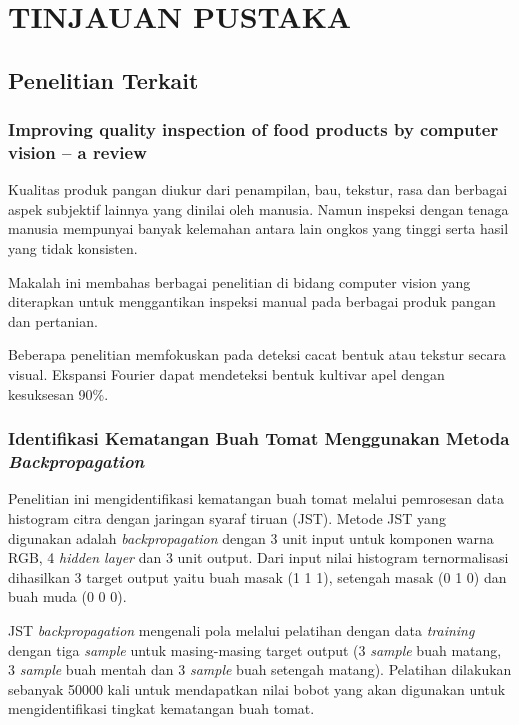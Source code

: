 \documentclass[laporan.tex]{subfiles}
\begin{document}
\chapter{TINJAUAN PUSTAKA}

\section{Penelitian Terkait}

\subsection{Improving quality inspection of food products by computer vision – a review}

Kualitas produk pangan diukur dari penampilan, bau, tekstur, rasa dan berbagai aspek subjektif lainnya yang dinilai oleh manusia. Namun inspeksi dengan tenaga manusia mempunyai banyak kelemahan antara lain ongkos yang tinggi serta  hasil yang tidak konsisten.

Makalah ini\cite{brosnan} membahas berbagai penelitian di bidang computer vision yang diterapkan untuk menggantikan inspeksi manual pada berbagai produk pangan dan pertanian.

Beberapa penelitian memfokuskan pada deteksi cacat bentuk atau tekstur secara visual. Ekspansi Fourier dapat mendeteksi bentuk kultivar apel dengan kesuksesan 90\%.

\subsection{Identifikasi Kematangan Buah Tomat Menggunakan Metoda \emph{Backpropagation}}

Penelitian ini mengidentifikasi kematangan buah tomat melalui pemrosesan data histogram citra dengan jaringan syaraf tiruan (JST). Metode JST yang digunakan adalah \emph{backpropagation} dengan 3 unit input untuk komponen warna RGB, 4 \emph{hidden layer} dan 3 unit output. Dari input nilai histogram ternormalisasi dihasilkan 3 target output yaitu buah masak (1 1 1), setengah masak (0 1 0) dan buah muda (0 0 0).\cite{derisma}

JST \emph{backpropagation} mengenali pola melalui pelatihan dengan data \emph{training} dengan tiga \emph{sample} untuk masing-masing target output (3 \emph{sample} buah matang, 3 \emph{sample} buah mentah dan 3 \emph{sample} buah setengah matang). Pelatihan dilakukan sebanyak 50000 kali untuk mendapatkan nilai bobot yang akan digunakan untuk mengidentifikasi tingkat kematangan buah tomat.
\end{document}
